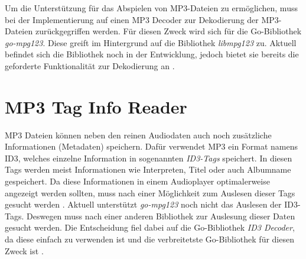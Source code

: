 Um die Unterstützung für das Abspielen von \ac{MP3}-Dateien zu ermöglichen,
muss bei der Implementierung auf einen \ac{MP3} Decoder zur Dekodierung
der \ac{MP3}-Dateien zurückgegriffen werden. Für diesen Zweck wird sich für die
Go-Bibliothek \textit{go-mpg123}. Diese greift im
Hintergrund auf die Bibliothek \textit{libmpg123} zu. Aktuell befindet sich die
Bibliothek noch in der Entwicklung, jedoch bietet sie bereits die
geforderte Funktionalität zur Dekodierung an \autocite{mp3_decoder}.

\section{MP3 Tag Info Reader}
\ac{MP3} Dateien können neben den reinen Audiodaten auch noch zusätzliche
Informationen (Metadaten) speichern. Dafür verwendet \ac{MP3} ein Format namens
\ac{ID3}, welches einzelne Information in
sogenannten \textit{\ac{ID3}-Tags} speichert. In diesen Tags werden meist
Informationen wie Interpreten, Titel oder auch Albumname gespeichert. Da diese
Informationen in einem Audioplayer optimalerweise angezeigt werden sollten,
muss nach einer Möglichkeit zum Auslesen dieser Tags gesucht werden \autocite{id3}. \hfill
\break
Aktuell unterstützt \textit{go-mpg123} noch nicht das Auslesen der \ac{ID3}-Tags.
Deswegen muss nach einer anderen Bibliothek zur Auslesung dieser Daten gesucht
werden. Die Entscheidung fiel dabei auf die Go-Bibliothek \textit{ID3 Decoder},
da diese einfach zu verwenden ist und die verbreitetste Go-Bibliothek
für diesen Zweck ist \autocite{id3_go_2015}.
